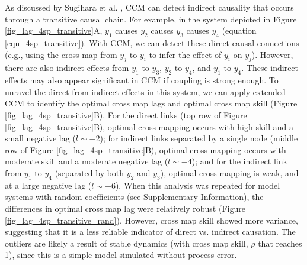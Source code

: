 As discussed by Sugihara et al. \cite{Sugihara_2012}, CCM can detect indirect causality that occurs through a transitive causal chain. For example, in the system depicted in Figure \ref{fig_lag_4sp_transitive}A, $y_1$ causes $y_2$ causes $y_3$ causes $y_4$ (equation \ref{eqn_4sp_transitive}). With CCM, we can detect these direct causal connections (e.g., using the cross map from $y_j$ to $y_i$ to infer the effect of $y_i$ on $y_j$). However, there are also indirect effects from $y_1$ to $y_3$, $y_2$ to $y_4$, and $y_1$ to $y_4$. These indirect effects may also appear significant in CCM if coupling is strong enough. To unravel the direct from indirect effects in this system, we can apply extended CCM to identify the optimal cross map lags and optimal cross map skill (Figure \ref{fig_lag_4sp_transitive}B). For the direct links (top row of Figure \ref{fig_lag_4sp_transitive}B), optimal cross mapping occurs with high skill and a small negative lag ($l \sim -2$); for indirect links separated by a single node (middle row of Figure \ref{fig_lag_4sp_transitive}B), optimal cross mapping occurs with moderate skill and a moderate negative lag ($l \sim -4$); and for the indirect link from $y_1$ to $y_4$ (separated by both $y_2$ and $y_3$), optimal cross mapping is weak, and at a large negative lag ($l \sim -6$). When this analysis was repeated for model systems with random coefficients (see Supplementary Information), the differences in optimal cross map lag were relatively robust (Figure \ref{fig_lag_4sp_transitive_rand}). However, cross map skill showed more variance, suggesting that it is a less reliable indicator of direct vs. indirect causation. The outliers are likely a result of stable dynamics (with cross map skill, $\rho$ that reaches 1), since this is a simple model simulated without process error.

